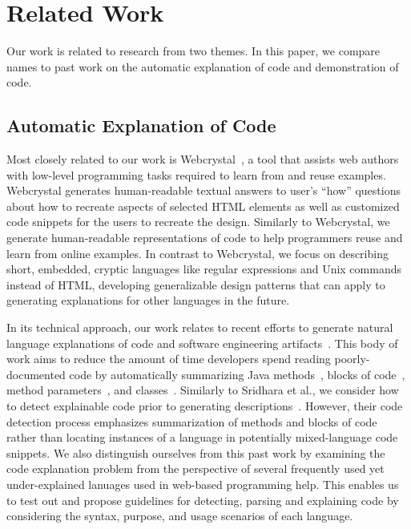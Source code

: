 \section{Related Work}

Our work is related to research from two themes.
In this paper, we compare \Glspl{name} to past work on the automatic explanation of code and demonstration of code.

\subsection{Automatic Explanation of Code}

Most closely related to our work is Webcrystal~\cite{chang_webcrystal_2012}, a tool that assists web authors with low-level programming tasks required to learn from and reuse examples.  
Webcrystal generates human-readable textual answers to user's ``how'' questions about how to recreate aspects of selected HTML elements as well as customized code snippets for the users to recreate the design.
Similarly to Webcrystal, we generate human-readable representations of code to help programmers reuse and learn from online examples.
In contrast to Webcrystal, we focus on describing short, embedded, cryptic languages like regular expressions and Unix commands instead of HTML, developing generalizable design patterns that can apply to generating explanations for other languages in the future.

In its technical approach, our work relates to recent efforts to generate natural language explanations of code and software engineering artifacts~\cite{sridhara_automatically_2011,burden_natural_2011,sridhara_towards_2010,kamimura_towards_2013,mcburney_automatic_2014,sridhara_generating_2011,haiduc_supporting_2010,moreno_automatic_2013}.
This body of work aims to reduce the amount of time developers spend reading poorly-documented code by automatically summarizing Java methods~\cite{sridhara_towards_2010}, blocks of code~\cite{sridhara_automatically_2011}, method parameters~\cite{sridhara_generating_2011}, and classes~\cite{moreno_automatic_2013}.
Similarly to Sridhara et al., we consider how to detect explainable code prior to generating descriptions~\cite{sridhara_automatically_2011,sridhara_towards_2010}.
However, their code detection process emphasizes summarization of methods and blocks of code rather than locating instances of a language in potentially mixed-language code snippets.
We also distinguish ourselves from this past work by examining the code explanation problem from the perspective of several frequently used yet under-explained lanuages used in web-based programming help.
This enables us to test out and propose guidelines for detecting, parsing and explaining code by considering the syntax, purpose, and usage scenarios of each language.

